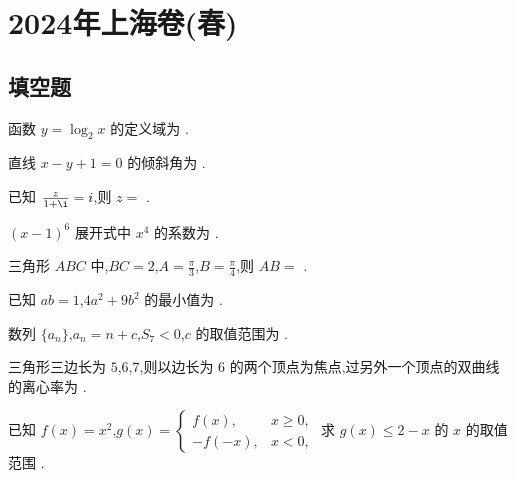 \chapter{2024年上海卷(春)}

\section{填空题}

\begin{problem}
函数 \(y=\log_2 x\) 的定义域为\fillinblank{} .
\end{problem}

\begin{problem}
直线 \(x-y+1=0\) 的倾斜角为\fillinblank{} .
\end{problem}

\begin{problem}
已知 \(\frac{z}{1+\i}=i\),则 \(z=\)\fillinblank{} .
\end{problem}

\begin{problem}
\(\left(x-1\right)^6\) 展开式中 \(x^4\) 的系数为\fillinblank{} .
\end{problem}

\begin{problem}
三角形 \(ABC\) 中,\(BC=2\),\(A=\frac{\pi}{3}\),\(B=\frac{\pi}{4}\),则 \(AB=\)\fillinblank{} .
\end{problem}

\begin{problem}
已知 \(ab=1\),\(4a^2+9b^2\) 的最小值为\fillinblank{} .
\end{problem}

\begin{problem}
数列 \(\{a_n\}\),\(a_n=n+c\),\(S_7<0\),\(c\) 的取值范围为\fillinblank{} .
\end{problem}

\begin{problem}
三角形三边长为 \(5\),\(6\),\(7\),则以边长为 \(6\) 的两个顶点为焦点,过另外一个顶点的双曲线的离心率为\fillinblank{} .
\end{problem}

\begin{problem}
已知 \(f(x)=x^2\),\(g(x)=\displaystyle\begin{cases}
f(x), & x\ge 0,\\
-f(-x), & x<0,
\end{cases}\) 求 \(g(x)\le 2-x\) 的 \(x\) 的取值范围\fillinblank{} .
\end{problem}

